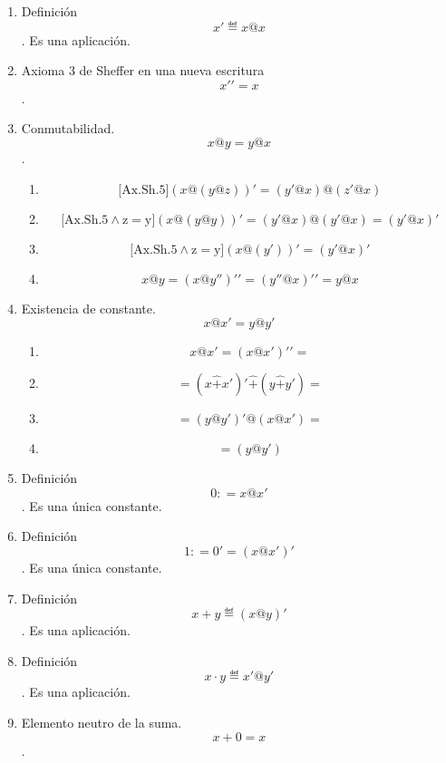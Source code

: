 \begin{enumerate}
\begin{enumerate}
\begin{enumerate}
\begin{enumerate}
        \begin{enumerate}
        \def\labelenumv{\arabic{enumv}.}
        \item
          Definición \[x' ≝ x@x\]. Es una aplicación.
        \item
          Axioma 3 de Sheffer en una nueva escritura \[x'{' = x}\].
        \item
          Conmutabilidad. \[x@{y = y}@x\].

          \begin{enumerate}
          \def\labelenumvi{\arabic{enumvi}.}
          \tightlist
          \item
            \[\mathbf{\mathrm{\lbrack{Ax.Sh.5}\rbrack}}{({x@{({y@z})}})}{' = {({y'@x})}}@{({z'@x})}\]
          \item
            \[\mathbf{\mathrm{\lbrack{{{Ax.Sh.5} \land z} = y}\rbrack}}{({x@{({y@y})}})}{' = {({y'@x})}}@{{({y'@x})} = {({y'@x})}}'\]
          \item
            \[\mathbf{\mathrm{\lbrack{{{Ax.Sh.5} \land z} = y}\rbrack}}{({x@{({y'})}})}{' = {({y'@x})}}'\]
          \item
            \[x@{y = {({x@y''})}}'{' = {({y''@x})}}'{' = {y@x}}\]
          \end{enumerate}
        \item
          Existencia de constante. \[x@x{' = y}@y'\]

          \begin{enumerate}
          \def\labelenumvi{\arabic{enumvi}.}
          \tightlist
          \item
            \[{{x@{x'}} = {({x@{x'}})}}'{' =}\]
          \item
            \[{= {({x\widehat{+}{x'}})}}'\widehat{+}{{({y\widehat{+}{y'}})} =}\]
          \item
            \[{= {({y@{y'}})}}'@{{({x@{x'}})} =}\]
          \item
            \[= {({y@{y'}})}\]
          \end{enumerate}
        \item
          Definición \[0{: = x}@x'\]. Es una única constante.
        \item
          Definición \[1{: = 0}{' = {({x@x'})}}'\]. Es una única
          constante.
        \item
          Definición \[{x + y} ≝ {({x@y})}'\]. Es una aplicación.
        \item
          Definición \[{x \cdot y} ≝ {x'@y'}\]. Es una aplicación.
        \item
          Elemento neutro de la suma. \[{x + 0} = x\].


\end{enumerate}
\end{enumerate}
\end{enumerate}
\end{enumerate}
\end{enumerate}
